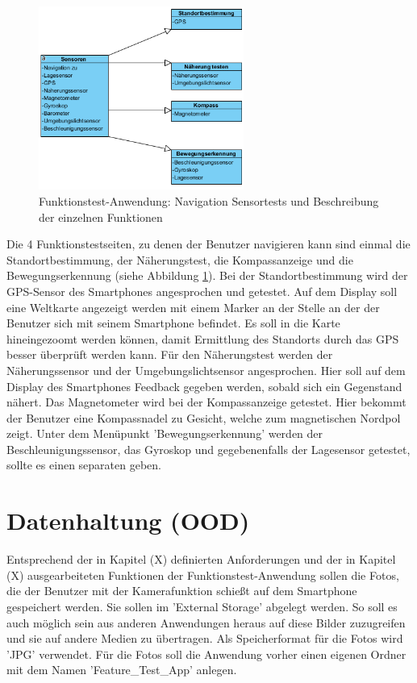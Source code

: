 \begin{figure}[h]
	\centering
	\includegraphics[width=0.6\textwidth]{Bilder/Diagram_2.PNG}
	\caption{Funktionstest-Anwendung: Navigation Sensortests und Beschreibung der einzelnen Funktionen}
	\label{fig:Diagram_2}
\end{figure}
\clearpage
Die 4 Funktionstestseiten, zu denen der Benutzer navigieren kann sind einmal die Standortbestimmung, der Näherungstest, die Kompassanzeige und die Bewegungserkennung (siehe Abbildung \ref{fig:Diagram_2}). Bei der Standortbestimmung wird der GPS-Sensor des Smartphones angesprochen und getestet. Auf dem Display soll eine Weltkarte angezeigt werden mit einem Marker an der Stelle an der der Benutzer sich mit seinem Smartphone befindet. Es soll in die Karte hineingezoomt werden können, damit Ermittlung des Standorts durch das GPS besser überprüft werden kann. Für den Näherungstest werden der Näherungssensor und der Umgebungslichtsensor angesprochen. Hier soll auf dem Display des Smartphones Feedback gegeben werden, sobald sich ein Gegenstand nähert. Das Magnetometer wird bei der Kompassanzeige getestet. Hier bekommt der Benutzer eine Kompassnadel zu Gesicht, welche zum magnetischen Nordpol zeigt. Unter dem Menüpunkt 'Bewegungserkennung' werden der Beschleunigungssensor, das Gyroskop und gegebenenfalls der Lagesensor getestet, sollte es einen separaten geben. 

\section{Datenhaltung (OOD)}

Entsprechend der in Kapitel (X) definierten Anforderungen und der in Kapitel (X) ausgearbeiteten Funktionen der Funktionstest-Anwendung sollen die Fotos, die der Benutzer mit der Kamerafunktion schießt auf dem Smartphone gespeichert werden. Sie sollen im 'External Storage' abgelegt werden. So soll es auch möglich sein aus anderen Anwendungen heraus auf diese Bilder zuzugreifen und sie auf andere Medien zu übertragen. Als Speicherformat für die Fotos wird 'JPG' verwendet. Für die Fotos soll die Anwendung vorher einen eigenen Ordner mit dem Namen 'Feature\_Test\_App' anlegen.

